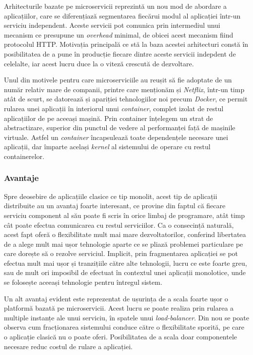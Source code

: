 Arhitecturile bazate pe microservicii reprezintă un nou mod de abordare a aplicațiilor, care se diferențiază segmentarea fiecărui modul al aplicației într-un serviciu independent. Aceste servicii pot comunica prin intermediul unui mecanism ce presupune un \textit{overhead} minimal, de obicei acest mecanism fiind protocolul HTTP\cite{onmicro}. Motivația principală ce stă la baza acestei arhitecturi constă în posibilitatea de a pune în producție fiecare dintre aceste servicii indepdent de celelalte, iar acest lucru duce la o viteză crescută de dezvoltare.

Unul din motivele pentru care microserviciile au reușit să fie adoptate de un număr relativ mare de companii, printre care menționăm și \textit{Netflix}, într-un timp atât de scurt, se datorează și apariției tehnologiilor noi precum \textit{Docker}, ce permit rularea unei aplicații în interiorul unui \textit{container}, complet izolat de restul aplicațiilor de pe aceeași mașină. Prin container înțelegem un strat de abstractizare, superior din punctul de vedere al performanței față de mașinile virtuale. Astfel un \textit{container} încapsulează toate dependențele necesare unei aplicații, dar împarte același \textit{kernel} al sistemului de operare cu restul containerelor. 

\subsubsection{Avantaje}

Spre deosebire de aplicațiile clasice ce tip monolit, acest tip de aplicații distribuite au un avantaj foarte interesant, ce provine din faptul că fiecare serviciu component al său poate fi scris în orice limbaj de programare, atât timp cât poate efectua comunicarea cu restul serviciilor. Ca o consecință naturală, acest fapt oferă o flexibilitate mult mai mare dezvoltatorilor, conferind libertatea de a alege mult mai ușor tehnologie aparte ce se pliază problemei particulare pe care dorește să o rezolve serviciul. Implicit, prin fragmentarea aplicației se pot efectua mult mai ușor și tranzițiile către alte tehnologii, lucru ce este foarte greu, sau de mult ori imposibil de efectuat în contextul unei aplicații monolotice, unde se folosește aceeași tehnologie pentru întregul sistem.

Un alt avantaj evident este reprezentat de ușurința de a scala foarte ușor o platformă bazată pe microservicii. Acest lucru se poate realiza prin rularea a multiple instanțe ale unui serviciu, în spatele unui \textit{load-balancer}. Din nou se poate observa cum fracționarea sistemului conduce către o flexibilitate sporită, pe care o aplicație clasică nu o poate oferi. Posibilitatea de a scala doar componentele necesare reduc costul de rulare a aplicației.

